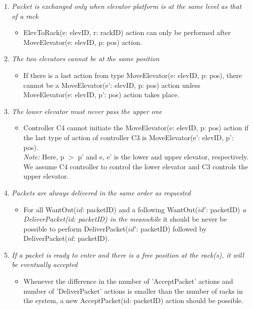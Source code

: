 \begin{enumerate}
\item \textit{Packet is exchanged only when elevator platform is at the same level as that of a rack}
	\begin{itemize}
	\item ElevToRack(e: elevID, r: rackID) action can only be performed after
	MoveElevator(e: elevID, p: pos) action.
	\end{itemize}
	
\item \textit{The two elevators cannot be at the same position}
	\begin{itemize}
	\item If there is a last action from type MoveElevator(e: elevID, p: pos),
	there cannot be a MoveElevator(e': elevID, p: pos) action unless 
	MoveElevator(e: elevID, p': pos) action takes place.

	\end{itemize}
		
\item \textit{The lower elevator must never pass the upper one}
	\begin{itemize}
	\item Controller C4 cannot initiate the MoveElevator(e: elevID, p: pos) 
	action if the last type of action of controller C3 is MoveElevator(e': elevID, p': pos).\\
	\textit{Note:} Here, p $>$ p' and e, e' is the lower and 
	upper elevator, respectively. We assume C4 controller to control
	the lower elevator and C3 controls the upper elevator.
	\end{itemize}
	
\item \textit{Packets are always delivered in the same order as
	requested}	
	\begin{itemize}
	\item 
	For all WantOut($id$: packetID) and a following WantOut($id'$: 
	packetID) \textit{a DeliverPacket(id: packetID) in the meanwhile} it
	should be never be possible to perform DeliverPacket($id'$: 
	packetID) followed by DeliverPacket($id$: packetID).
	\end{itemize}
	
\item \textit{If a packet is ready to enter and there is a free
	position at the rack(s), it will be eventually accepted}
	\begin{itemize}
	\item Whenever the difference in the number of 'AcceptPacket'
	actions and number of 'DeliverPacket' actions is  smaller than the
	number of racks in the system, a new AcceptPacket(id: packetID)
	action should be possible.
	\end{itemize}
	

\end{enumerate}

